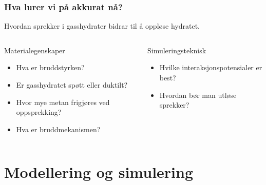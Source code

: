 \documentclass[utf8x, notes, graphics]{beamer}
\begin{document}
\begin{frame}
\frametitle{Hva lurer vi på akkurat nå?}
Hvordan sprekker i gasshydrater bidrar til å oppløse hydratet.
\begin{columns}[T]
\begin{block}{Materialegenskaper}
\begin{itemize}
\item Hva er bruddstyrken?
\item Er gasshydratet spøtt eller duktilt?
\item Hvor mye metan frigjøres ved oppsprekking?
\item Hva er bruddmekanismen?
\end{itemize}
\end{block}
\begin{block}{Simuleringsteknisk}
\begin{itemize}
\item Hvilke interaksjonspotensialer er best?
\item Hvordan bør man utløse sprekker?
\end{itemize}
\end{block}
\end{columns}
\end{frame}

\section{Modellering og simulering}
\end{document}
